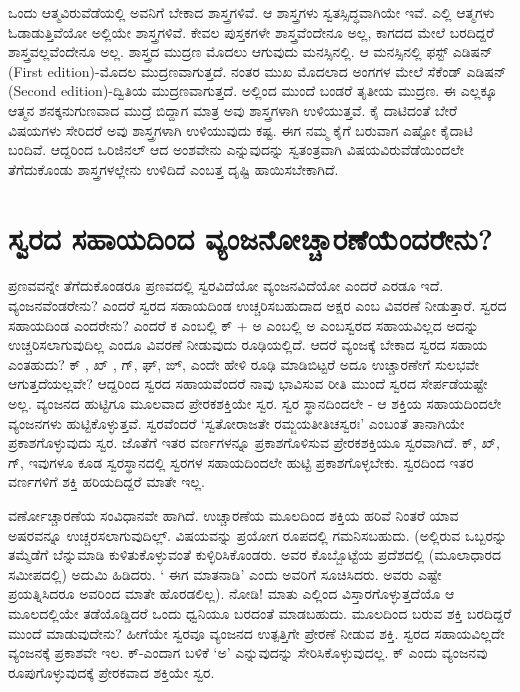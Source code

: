 ಒಂದು ಆತ್ಮವಿರುವೆಡೆಯಲ್ಲಿ ಅವನಿಗೆ ಬೇಕಾದ ಶಾಸ್ತ್ರಗಳಿವೆ. ಆ ಶಾಸ್ತ್ರಗಳು ಸ್ವತಸ್ಸಿದ್ಧವಾಗಿಯೇ ಇವೆ. ಎಲ್ಲಿ ಆತ್ಮಗಳು ಓಡಾಡುತ್ತಿವೆಯೋ ಅಲ್ಲಿಯೇ ಶಾಸ್ತ್ರಗಳಿವೆ. ಕೇವಲ ಪುಸ್ತಕಗಳೇ ಶಾಸ್ತ್ರವೆಂದೇನೂ ಅಲ್ಲ, ಕಾಗದದ ಮೇಲೆ ಬರದಿದ್ದರೆ ಶಾಸ್ತ್ರವಲ್ಲವೆಂದೇನೂ ಅಲ್ಲ. ಶಾಸ್ತ್ರದ ಮುದ್ರಣ ಮೊದಲು ಆಗುವುದು ಮನಸ್ಸಿನಲ್ಲಿ. ಆ ಮನಸ್ಸಿನಲ್ಲಿ ಫಸ್ಟ್  ಎಡಿಷನ್ {(\eng First edition)}-ಮೊದಲ ಮುದ್ರಣವಾಗುತ್ತದೆ. ನಂತರ ಮುಖ ಮೊದಲಾದ ಅಂಗಗಳ ಮೇಲೆ ಸೆಕೆಂಡ್ ಎಡಿಷನ್ {(\eng Second edition)}-ದ್ವಿತಿಯ ಮುದ್ರಣವಾಗುತ್ತದೆ. ಅಲ್ಲಿಂದ ಮುಂದೆ ಬಂಡರೆ ತೃತೀಯ ಮುದ್ರಣ. ಈ ಎಲ್ಲಕ್ಕೂ ಆತ್ಮನ ಶನಕ್ಕನುಗುಣವಾದ ಮುದ್ರೆ ಬಿದ್ದಾಗ ಮಾತ್ರ ಅವು ಶಾಸ್ತ್ರಗಳಾಗಿ ಉಳಿಯುತ್ತವೆ. ಕೈ ದಾಟಿದಂತೆ ಬೇರೆ ವಿಷಯಗಳು ಸೇರಿದರೆ ಅವು ಶಾಸ್ತ್ರಗಳಾಗಿ ಉಳಿಯುವುದು ಕಷ್ಟ. ಈಗ ನಮ್ಮ ಕೈಗೆ ಬರುವಾಗ ಎಷ್ಟೋ ಕೈದಾಟಿ ಬಂದಿವೆ. ಆದ್ದರಿಂದ ಒರಿಜಿನಲ್ ಆದ ಅಂಶವೇನು ಎನ್ನುವುದನ್ನು ಸ್ವತಂತ್ರವಾಗಿ ವಿಷಯವಿರುವೆಡೆಯಿಂದಲೇ ತೆಗೆದುಕೊಂಡು ಶಾಸ್ತ್ರಗಳಲ್ಲೇನು ಉಳಿದಿದೆ ಎಂಬತ್ತ ದೃಷ್ಟಿ ಹಾಯಿಸಬೇಕಾಗಿದೆ.

\section*{ಸ್ವರದ ಸಹಾಯದಿಂದ ವ್ಯಂಜನೋಚ್ಚಾರಣೆಯೆಂದರೇನು?}

ಪ್ರಣವವನ್ನೇ ತೆಗೆದುಕೊಂಡರೂ ಪ್ರಣವದಲ್ಲಿ ಸ್ವರವಿದೆಯೋ ವ್ಯಂಜನವಿದೆಯೋ ಎಂದರೆ ಎರಡೂ ಇದೆ. ವ್ಯಂಜನವೆಂಡರೇನು? ಎಂದರೆ ಸ್ವರದ ಸಹಾಯದಿಂಡ ಉಚ್ಚರಿಸಬಹುದಾದ ಅಕ್ಷರ ಎಂಬ ವಿವರಣೆ ನೀಡುತ್ತಾರೆ. ಸ್ವರದ ಸಹಾಯದಿಂಡ ಎಂದರೇನು? ಎಂದರೆ ಕ ಎಂಬಲ್ಲಿ ಕ್ + ಅ ಎಂಬಲ್ಲಿ ಅ ಎಂಬಸ್ವರದ ಸಹಾಯವಿಲ್ಲದ ಅದನ್ನು ಉಚ್ಚರಿಸಲಾಗುವುದಿಲ್ಲ ಎಂದೂ ವಿವರಣೆ ನೀಡುವುದು ರೂಢಿಯಲ್ಲಿದೆ. ಆದರೆ ವ್ಯಂಜಕ್ಕೆ  ಬೇಕಾದ ಸ್ವರದ ಸಹಾಯ ಎಂತಹುದು? ಕ್ , ಖ್ , ಗ್, ಘ್, ಙ್, ಎಂದೇ ಹೇಳಿ ರೂಢಿ ಮಾಡಿಬಿಟ್ಟರೆ ಅದೂ ಉಚ್ಚಾರಣೇಗೆ ಸುಲಭವೇ ಆಗುತ್ತದೆಯಲ್ಲವೇ? ಆದ್ದರಿಂದ ಸ್ವರದ ಸಹಾಯವೆಂದರೆ ನಾವು ಭಾವಿಸುವ ರೀತಿ ಮುಂದೆ ಸ್ವರದ ಸೇರ್ಪಡೆಯಷ್ಟೇ ಅಲ್ಲ. ವ್ಯಂಜನದ ಹುಟ್ಟಿಗೂ ಮೂಲವಾದ ಪ್ರೇರಕಶಕ್ತಿಯೇ ಸ್ವರ. ಸ್ವರ ಸ್ಥಾನದಿಂದಲೇ - ಆ ಶಕ್ತಿಯ ಸಹಾಯದಿಂದಲೇ ವ್ಯಂಜನಗಳು ಹುಟ್ಟಿಕೊಳ್ಳುತ್ತವೆ. ಸ್ವರವೆಂದರೆ `ಸ್ವತೋರಾಜತೇ ರಮ್ಜಯತೀತಿಚಸ್ವರಃ' ಎಂಬಂತೆ ತಾನಾಗಿಯೇ ಪ್ರಕಾಶಗೊಳ್ಳುವುದು ಸ್ವರ. ಜೊತೆಗೆ ಇತರ ವರ್ಣಗಳನ್ನೂ ಪ್ರಕಾಶಗೊಳಿಸುವ ಪ್ರೇರಕಶಕ್ತಿಯೂ ಸ್ವರವಾಗಿದೆ. ಕ್, ಖ್, ಗ್, ಇವುಗಳೂ ಕೂಡ ಸ್ವರಸ್ಥಾನದಲ್ಲಿ ಸ್ವರಗಳ ಸಹಾಯದಿಂದಲೇ ಹುಟ್ಟಿ ಪ್ರಕಾಶಗೊಳ್ಳಬೇಕು. ಸ್ವರದಿಂದ ಇತರ ವರ್ಣಗಳಿಗೆ ಶಕ್ತಿ ಹರಿಯದಿದ್ದರೆ ಮಾತೇ ಇಲ್ಲ.

ವರ್ಣೋಚ್ಚಾರಣೆಯ ಸಂವಿಧಾನವೇ ಹಾಗಿದೆ.  ಉಚ್ಚಾರಣೆಯ ಮೂಲದಿಂದ ಶಕ್ತಿಯ ಹರಿವೆ ನಿಂತರೆ ಯಾವ ಅಷರವನ್ನೂ ಉಚ್ಚರಸಲಾಗುವುದಿಲ್ಲ್. ವಿಷಯವನ್ನು ಪ್ರಯೋಗ ರೂಪದಲ್ಲಿ ಗಮನಿಸಬಹುದು. (ಅಲ್ಲಿರುವ ಒಬ್ಬರನ್ನು ತಮ್ಮೆಡೆಗೆ ಬೆನ್ನುಮಾಡಿ ಕುಳಿತುಕೊಳ್ಳುವಂತೆ ಕುಳ್ಳಿರಿಸಿಕೊಂಡರು. ಅವರ ಕೊಬ್ಬೊಟ್ಟೆಯ ಪ್ರದೆಶದಲ್ಲಿ (ಮೂಲಾಧಾರದ ಸಮೀಪದಲ್ಲಿ) ಅದುಮಿ ಹಿಡಿದರು. ` ಈಗ ಮಾತನಾಡಿ' ಎಂದು ಅವರಿಗೆ ಸೂಚಿಸಿದರು. ಅವರು ಎಷ್ಟೇ ಪ್ರಯತ್ನಿಸಿದರೂ ಅವರಿಂದ ಮಾತೇ ಹೊರಡಲಿಲ್ಲ).  ನೋಡಿ! ಮಾತು ಎಲ್ಲಿಂದ ವಿಸ್ತಾರಗೊಳ್ಳುತ್ತದೆಯೊ ಆ ಮೂಲದಲ್ಲಿಯೇ ತಡೆಯೊಡ್ಡಿದರೆ ಒಂದು ಧ್ವನಿಯೂ ಬರದಂತೆ ಮಾಡಬಹುದು. ಮೂಲದಿಂದ ಬರುವ ಶಕ್ತಿ ಬರದಿದ್ದರೆ ಮುಂದೆ ಮಾಡುವುದೇನು? ಹೀಗೆಯೇ ಸ್ವರವೂ ವ್ಯಂಜನದ ಉತ್ಪತ್ತಿಗೇ ಪ್ರೇರಣೆ ನೀಡುವ ಶಕ್ತಿ. ಸ್ವರದ ಸಹಾಯವಿಲ್ಲದೇ ವ್ಯಂಜನಕ್ಕೆ  ಪ್ರಕಾಶವೇ ಇಲ. ಕ್-ಎಂದಾಗ ಬಳಿಕೆ `ಅ' ಎನ್ನುವುದನ್ನು ಸೇರಿಸಿಕೊಳ್ಳುವುದಲ್ಲ. ಕ್ ಎಂದು ವ್ಯಂಜನವು ರೂಪುಗೊಳ್ಳುವುದಕ್ಕೆ  ಪ್ರೇರಕವಾದ ಶಕ್ತಿಯೇ ಸ್ವರ.

